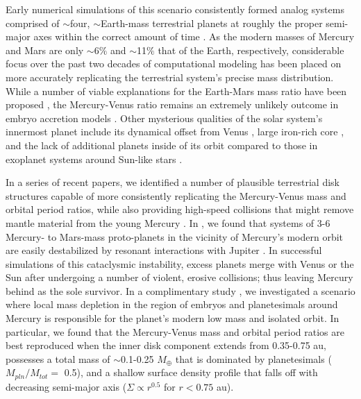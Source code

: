 \documentclass[trackchanges,twocolumn]{aastex}
\begin{document}
Early numerical simulations of this scenario consistently formed analog systems comprised of $\sim$four, $\sim$Earth-mass terrestrial planets at roughly the proper semi-major axes within the correct amount of time \citep{chambers01,ray18_rev}.  As the modern masses of Mercury and Mars are only $\sim$6$\%$ and $\sim$11$\%$ that of the Earth, respectively, considerable focus over the past two decades of computational modeling has been placed on more accurately replicating the terrestrial system's precise mass distribution.  While a number of viable explanations for the Earth-Mars mass ratio have been proposed \citep[e.g.:][]{walsh11,ray17sci,clement18}, the Mercury-Venus ratio remains an extremely unlikely outcome in embryo accretion models \citep{ray18_rev}.  Other mysterious qualities of the solar system's innermost planet include its dynamical offset from Venus \citep[quantified by the ratio their orbital periods, $P_{V}/P_{M} =$ 2.6; much larger than those of the other neighboring terrestrial planets:][]{clement21_merc3}, large iron-rich core \citep[$\sim$70-80$\%$ of its total mass:][]{hauck13}, and the lack of additional planets inside of its orbit compared to those in exoplanet systems around Sun-like stars \citep[a plethora of which host short-period Super-Earths:][]{zhu18}.

In a series of recent papers, we identified a number of plausible terrestrial disk structures capable of more consistently replicating the Mercury-Venus mass and orbital period ratios, while also providing high-speed collisions that might remove mantle material from the young Mercury \citep[thus aiding in the reproduction its modern, iron-rich core:][]{benz88,asphaug14}.  In \citet{clement21_merc3}, we found that systems of 3-6 Mercury- to Mars-mass proto-planets in the vicinity of Mercury's modern orbit are easily destabilized by resonant interactions with Jupiter \citep{batygin15b}.  In successful simulations of this cataclysmic instability, excess planets merge with Venus or the Sun after undergoing a number of violent, erosive collisions; thus leaving Mercury behind as the sole survivor.  In a complimentary study \citep{clement21_merc2}, we investigated a scenario where local mass depletion in the region of embryos and planetesimals around Mercury \citep[e.g.:][]{lykawka17} is responsible for the planet's modern low mass and isolated orbit.  In particular, we found that the Mercury-Venus mass and orbital period ratios are best reproduced when the inner disk component extends from 0.35-0.75 au, possesses a total mass of $\sim$0.1-0.25 $M_{\oplus}$ that is dominated by planetesimals ($M_{pln}/M_{tot}=$ 0.5), and a shallow surface density profile that falls off with decreasing semi-major axis ($\Sigma \propto r^{0.5}$ for $r<0.75$ au).
\end{document}
